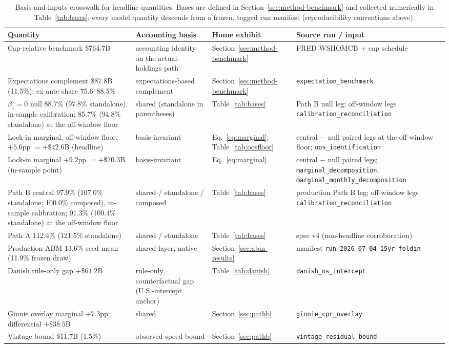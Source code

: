 \documentclass[12pt]{article}
\begin{document}
\begin{table}[H]
\centering
\footnotesize
\begin{threeparttable}
\caption{Basis-and-inputs crosswalk for headline quantities. Bases are defined in Section~\ref{sec:method-benchmark} and collected numerically in Table~\ref{tab:bases}; every model quantity descends from a frozen, tagged run manifest (reproducibility conventions above).}
\label{tab:crosswalk}
\begin{tabular}{@{}p{4.9cm}p{3.4cm}p{2.2cm}p{3.9cm}@{}}
\toprule
Quantity & Accounting basis & Home exhibit & Source run / input \\
\midrule
Cap-relative benchmark \$764.7B & accounting identity on the actual-holdings path & Section~\ref{sec:method-benchmark} & FRED WSHOMCB + cap schedule \\
Expectations complement \$87.8B (11.5\%); ex-ante share 75.6--88.5\% & expectations-based complement & Section~\ref{sec:method-benchmark} & \texttt{expectation\_benchmark} \\
$\beta_1 = 0$ null 88.7\% (97.8\% standalone), in-sample calibration; 85.7\% (94.8\% standalone) at the off-window floor & shared (standalone in parentheses) & Table~\ref{tab:bases} & Path B null leg; off-window legs \texttt{calibration\_reconciliation} \\
Lock-in marginal, off-window floor, $+5.6$pp $= +\$42.6$B (headline) & basis-invariant & Eq.~\eqref{eq:marginal}; Table~\ref{tab:oosfloor} & central $-$ null paired legs at the off-window floor; \texttt{oos\_identification} \\
Lock-in marginal $+9.2$pp $= +\$70.3$B (in-sample point) & basis-invariant & Eq.~\eqref{eq:marginal} & central $-$ null paired legs; \texttt{marginal\_decomposition}, \texttt{marginal\_monthly\_decomposition} \\
Path B central 97.9\% (107.0\% standalone; 100.0\% composed), in-sample calibration; 91.3\% (100.4\% standalone) at the off-window floor & shared / standalone / composed & Table~\ref{tab:bases} & production Path B leg; off-window legs \texttt{calibration\_reconciliation} \\
Path A 112.4\% (121.5\% standalone) & shared / standalone & Table~\ref{tab:bases} & spec v4 (non-headline corroboration) \\
Production ABM 13.6\% seed mean (11.9\% frozen draw) & shared layer, native & Section~\ref{sec:abm-results} & manifest \texttt{run-2026-07-04-15yr-foldin} \\
Danish rule-only gap $+\$61.2$B & rule-only counterfactual gap (U.S.-intercept anchor) & Table~\ref{tab:danish} & \texttt{danish\_us\_intercept} \\
Ginnie overlay marginal $+7.3$pp; differential $+\$38.5$B & shared & Section~\ref{sec:pathb} & \texttt{ginnie\_cpr\_overlay} \\
Vintage bound \$11.7B (1.5\%) & observed-speed bound & Section~\ref{sec:pathb} & \texttt{vintage\_residual\_bound} \\
\bottomrule
\end{tabular}
\end{threeparttable}
\end{table}
\end{document}
